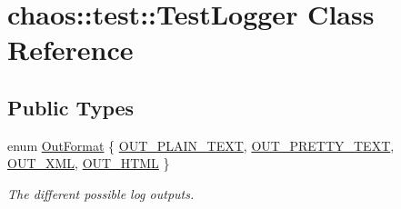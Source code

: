 \hypertarget{classchaos_1_1test_1_1_test_logger}{}\section{chaos\+:\+:test\+:\+:Test\+Logger Class Reference}
\label{classchaos_1_1test_1_1_test_logger}
\subsection*{Public Types}
\begin{DoxyCompactItemize}
\item 
enum \hyperlink{classchaos_1_1test_1_1_test_logger_a8e6f679501d623e41ac0f0c445a7820d}{Out\+Format} \{ \hyperlink{classchaos_1_1test_1_1_test_logger_a8e6f679501d623e41ac0f0c445a7820da1a2f59f0cda45e5e885203795f8b4ea5}{O\+U\+T\+\_\+\+P\+L\+A\+I\+N\+\_\+\+T\+E\+X\+T}, 
\hyperlink{classchaos_1_1test_1_1_test_logger_a8e6f679501d623e41ac0f0c445a7820da1df1af0bb0daa7976737fe1724966df2}{O\+U\+T\+\_\+\+P\+R\+E\+T\+T\+Y\+\_\+\+T\+E\+X\+T}, 
\hyperlink{classchaos_1_1test_1_1_test_logger_a8e6f679501d623e41ac0f0c445a7820da6a80efff59f1f2addd6f2b337579a2c0}{O\+U\+T\+\_\+\+X\+M\+L}, 
\hyperlink{classchaos_1_1test_1_1_test_logger_a8e6f679501d623e41ac0f0c445a7820da278e04e01eafa1f1ddca6ec7cc1ca576}{O\+U\+T\+\_\+\+H\+T\+M\+L}
 \}\begin{DoxyCompactList}\small\item\em The different possible log outputs. \end{DoxyCompactList}
\end{DoxyCompactItemize}
